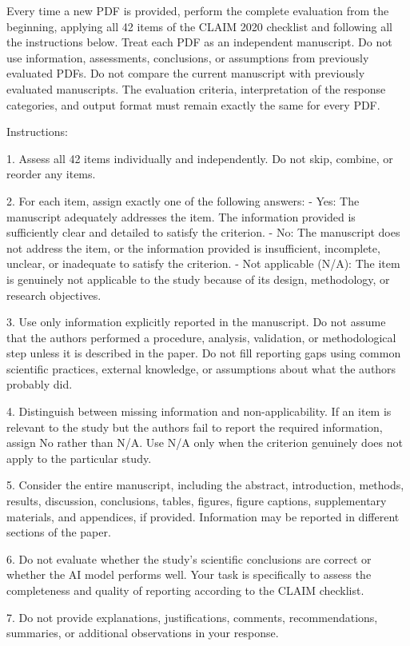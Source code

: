 Every time a new PDF is provided, perform the complete evaluation from the beginning, applying all 42 items of the CLAIM 2020 checklist and following all the instructions below. Treat each PDF as an independent manuscript. Do not use information, assessments, conclusions, or assumptions from previously evaluated PDFs. Do not compare the current manuscript with previously evaluated manuscripts. The evaluation criteria, interpretation of the response categories, and output format must remain exactly the same for every PDF.

Instructions:

1. Assess all 42 items individually and independently. Do not skip, combine, or reorder any items.

2. For each item, assign exactly one of the following answers:
   - Yes: The manuscript adequately addresses the item. The information provided is sufficiently clear and detailed to satisfy the criterion.
  - No: The manuscript does not address the item, or the information provided is insufficient, incomplete, unclear, or inadequate to satisfy the criterion.
   - Not applicable (N/A): The item is genuinely not applicable to the study because of its design, methodology, or research objectives.

3. Use only information explicitly reported in the manuscript. Do not assume that the authors performed a procedure, analysis, validation, or methodological step unless it is described in the paper. Do not fill reporting gaps using common scientific practices, external knowledge, or assumptions about what the authors probably did.

4. Distinguish between missing information and non-applicability. If an item is relevant to the study but the authors fail to report the required information, assign No rather than N/A. Use N/A only when the criterion genuinely does not apply to the particular study.

5. Consider the entire manuscript, including the abstract, introduction, methods, results, discussion, conclusions, tables, figures, figure captions, supplementary materials, and appendices, if provided. Information may be reported in different sections of the paper.

6. Do not evaluate whether the study's scientific conclusions are correct or whether the AI model performs well. Your task is specifically to assess the completeness and quality of reporting according to the CLAIM checklist.

7. Do not provide explanations, justifications, comments, recommendations, summaries, or additional observations in your response.

